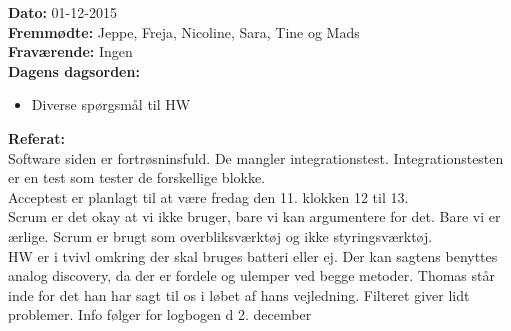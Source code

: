 \textbf{Dato:} 01-12-2015\\

\textbf{Fremmødte:} Jeppe, Freja, Nicoline, Sara, Tine og Mads\\

\textbf{Fraværende:} Ingen\\

\textbf{Dagens dagsorden:}
\begin{itemize}
	\item Diverse spørgsmål til HW 
\end{itemize}

\textbf{Referat:}\\

Software siden er fortrøsninsfuld. De mangler integrationstest. Integrationstesten er en test som tester de forskellige blokke.\\

Acceptest er planlagt til at være fredag den 11. klokken 12 til 13.\\

Scrum er det okay at vi ikke bruger, bare vi kan argumentere for det. Bare vi er ærlige. Scrum er brugt som overbliksværktøj og ikke styringsværktøj. \\

HW er i tvivl omkring der skal bruges batteri eller ej. Der kan sagtens benyttes analog discovery, da der er fordele og ulemper ved begge metoder. Thomas står inde for det han har sagt til os i løbet af hans vejledning. Filteret giver lidt problemer. Info følger for logbogen d 2. december\\